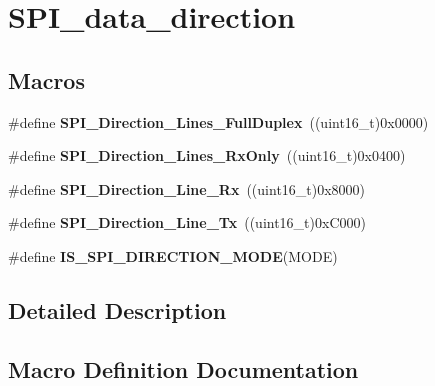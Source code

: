 \hypertarget{group___s_p_i__data__direction}{}\section{S\+P\+I\+\_\+data\+\_\+direction}
\label{group___s_p_i__data__direction}
\subsection*{Macros}
\begin{DoxyCompactItemize}
\item 
\mbox{\label{group___s_p_i__data__direction_gab6bdb82e315a90210c4425c46bbdf5f1}} 
\#define {\bfseries S\+P\+I\+\_\+\+Direction\+\_\+Lines\+\_\+\+Full\+Duplex}~((uint16\+\_\+t)0x0000)
\item 
\mbox{\label{group___s_p_i__data__direction_gab8ab942f7240394f50e4c86c5288516a}} 
\#define {\bfseries S\+P\+I\+\_\+\+Direction\+\_\+Lines\+\_\+\+Rx\+Only}~((uint16\+\_\+t)0x0400)
\item 
\mbox{\label{group___s_p_i__data__direction_ga42ea8306cfc1f23ffc51efae6f66320e}} 
\#define {\bfseries S\+P\+I\+\_\+\+Direction\+\_\+Line\+\_\+\+Rx}~((uint16\+\_\+t)0x8000)
\item 
\mbox{\label{group___s_p_i__data__direction_ga70cc710a771065b2ed11c2ac9697defe}} 
\#define {\bfseries S\+P\+I\+\_\+\+Direction\+\_\+Line\+\_\+\+Tx}~((uint16\+\_\+t)0x\+C000)
\item 
\#define {\bfseries I\+S\+\_\+\+S\+P\+I\+\_\+\+D\+I\+R\+E\+C\+T\+I\+O\+N\+\_\+\+M\+O\+DE}(M\+O\+DE)
\end{DoxyCompactItemize}


\subsection{Detailed Description}


\subsection{Macro Definition Documentation}
\mbox{\label{group___s_p_i__data__direction_ga536857c68ce1d9806c04046707448b3e}} 
